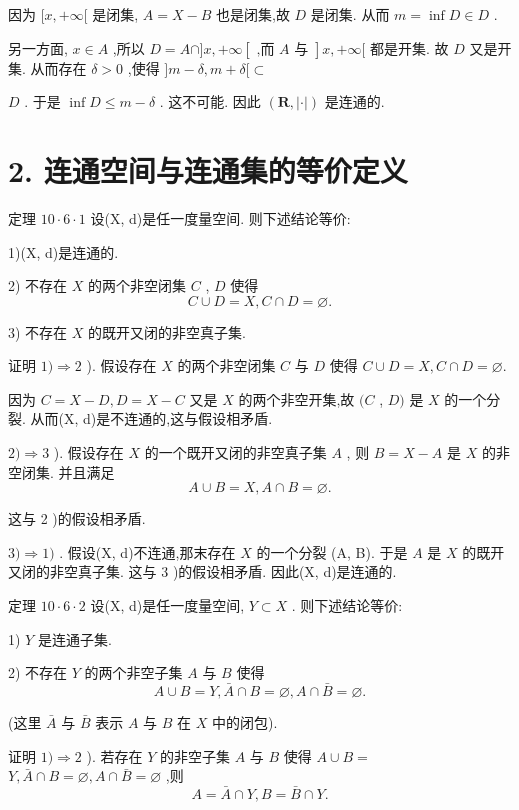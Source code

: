 因为 $\lbrack x, + \infty \lbrack$ 是闭集, $A = X - B$ 也是闭集,故 $D$ 是闭集. 从而 $m = \inf D \in  D$ .

另一方面, $x \in  A$ ,所以 $D = A \cap  \rbrack x, + \infty \left\lbrack  {\text{ ,而 }A\text{ 与 }}\right\rbrack  x, + \infty \lbrack$ 都是开集. 故 $D$ 又是开集. 从而存在 $\delta  > 0$ ,使得 $\rbrack m - \delta ,m + \delta \lbrack  \subset$

$D$ . 于是 $\inf D \leq  m - \delta$ . 这不可能. 因此 $\left( {\mathbf{R},\left| \cdot \right| }\right)$ 是连通的.

\section*{2. 连通空间与连通集的等价定义}

定理 ${10} \cdot  6 \cdot  1$ 设(X, d)是任一度量空间. 则下述结论等价:

1)(X, d)是连通的.

2) 不存在 $X$ 的两个非空闭集 $C$ , $D$ 使得
$$C \cup  D = X,C \cap  D = \varnothing .$$

3) 不存在 $X$ 的既开又闭的非空真子集.

证明 $1) \Rightarrow  2$ ). 假设存在 $X$ 的两个非空闭集 $C$ 与 $D$ 使得 $C \cup  D = X,C \cap  D = \varnothing .$

因为 $C = X - D,D = X - C$ 又是 $X$ 的两个非空开集,故 $(C$ , $D)$ 是 $X$ 的一个分裂. 从而(X, d)是不连通的,这与假设相矛盾.

$2) \Rightarrow  3$ ). 假设存在 $X$ 的一个既开又闭的非空真子集 $A$ , 则 $B = X - A$ 是 $X$ 的非空闭集. 并且满足
$$A \cup  B = X,A \cap  B = \varnothing .$$

这与 2 )的假设相矛盾.

$3) \Rightarrow  1)$ . 假设(X, d)不连通,那末存在 $X$ 的一个分裂 (A, B). 于是 $A$ 是 $X$ 的既开又闭的非空真子集. 这与 3 )的假设相矛盾. 因此(X, d)是连通的.

定理 ${10} \cdot  6 \cdot  2$ 设(X, d)是任一度量空间, $Y \subset  X$ . 则下述结论等价:

1) $Y$ 是连通子集.

2) 不存在 $Y$ 的两个非空子集 $A$ 与 $B$ 使得
$$A \cup  B = Y,\bar{A} \cap  B = \varnothing ,A \cap  \bar{B} = \varnothing .$$

(这里 $\bar{A}$ 与 $\bar{B}$ 表示 $A$ 与 $B$ 在 $X$ 中的闭包).

证明 $1) \Rightarrow  2$ ). 若存在 $Y$ 的非空子集 $A$ 与 $B$ 使得 $A \cup  B =$  $Y,\bar{A} \cap  B = \varnothing ,A \cap  \bar{B} = \varnothing$ ,则
$$A = \bar{A} \cap  Y,B = \bar{B} \cap  Y.$$

